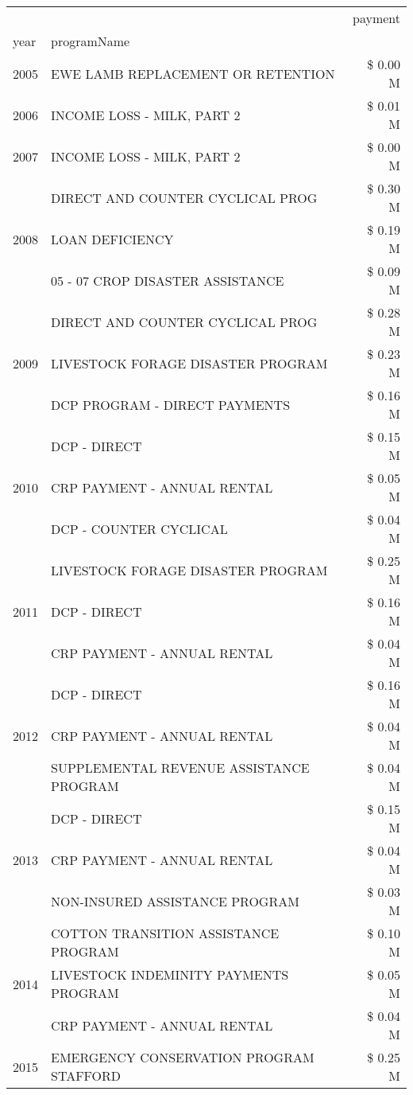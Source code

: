 \begin{tabular}{llr}
\toprule
 &  & payment \\
year & programName &  \\
\midrule
2005 & EWE LAMB REPLACEMENT OR RETENTION & \$ 0.00 M \\
\cline{1-3}
2006 & INCOME LOSS - MILK, PART 2 & \$ 0.01 M \\
\cline{1-3}
2007 & INCOME LOSS - MILK, PART 2 & \$ 0.00 M \\
\cline{1-3}
\multirow[t]{3}{*}{2008} & DIRECT AND COUNTER CYCLICAL PROG & \$ 0.30 M \\
 & LOAN DEFICIENCY & \$ 0.19 M \\
 & 05 - 07 CROP DISASTER ASSISTANCE & \$ 0.09 M \\
\cline{1-3}
\multirow[t]{3}{*}{2009} & DIRECT AND COUNTER CYCLICAL PROG & \$ 0.28 M \\
 & LIVESTOCK FORAGE DISASTER  PROGRAM & \$ 0.23 M \\
 & DCP PROGRAM - DIRECT PAYMENTS & \$ 0.16 M \\
\cline{1-3}
\multirow[t]{3}{*}{2010} & DCP - DIRECT & \$ 0.15 M \\
 & CRP PAYMENT - ANNUAL RENTAL & \$ 0.05 M \\
 & DCP - COUNTER CYCLICAL & \$ 0.04 M \\
\cline{1-3}
\multirow[t]{3}{*}{2011} & LIVESTOCK FORAGE DISASTER PROGRAM & \$ 0.25 M \\
 & DCP - DIRECT & \$ 0.16 M \\
 & CRP PAYMENT - ANNUAL RENTAL & \$ 0.04 M \\
\cline{1-3}
\multirow[t]{3}{*}{2012} & DCP - DIRECT & \$ 0.16 M \\
 & CRP PAYMENT - ANNUAL RENTAL & \$ 0.04 M \\
 & SUPPLEMENTAL REVENUE ASSISTANCE PROGRAM & \$ 0.04 M \\
\cline{1-3}
\multirow[t]{3}{*}{2013} & DCP - DIRECT & \$ 0.15 M \\
 & CRP PAYMENT - ANNUAL RENTAL & \$ 0.04 M \\
 & NON-INSURED ASSISTANCE PROGRAM & \$ 0.03 M \\
\cline{1-3}
\multirow[t]{3}{*}{2014} & COTTON TRANSITION ASSISTANCE PROGRAM & \$ 0.10 M \\
 & LIVESTOCK INDEMINITY PAYMENTS PROGRAM & \$ 0.05 M \\
 & CRP PAYMENT - ANNUAL RENTAL & \$ 0.04 M \\
\cline{1-3}
\multirow[t]{3}{*}{2015} & EMERGENCY CONSERVATION PROGRAM STAFFORD & \$ 0.25 M \\

\end{tabular}
